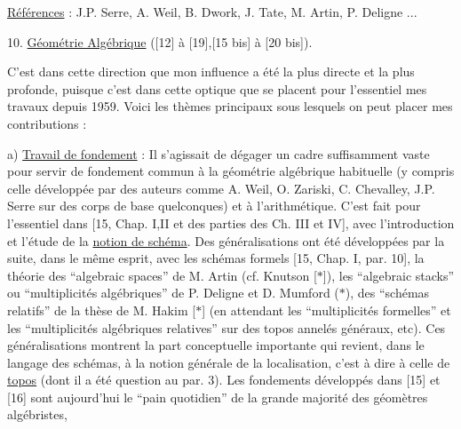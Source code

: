 
\uline{Références} : J.P. Serre, A. Weil, B. Dwork, J. Tate,
M. Artin, P. Deligne ...

10. \uline{Géométrie Algébrique} ([12] à [19],[15 bis] à [20 bis]).

C'est dans cette direction que mon influence
a été la plus directe et la plus profonde, puisque
c'est dans cette optique que se placent pour l'essentiel
mes travaux depuis 1959. Voici les thèmes principaux
sous lesquels on peut placer mes contributions :

a) \uline{Travail de fondement} : Il s'agissait de dégager
un cadre suffisamment vaste pour servir de fondement
commun à la géométrie algébrique habituelle (y compris
celle développée par des auteurs comme A. Weil,
O. Zariski, C. Chevalley, J.P. Serre sur des corps de
base quelconques) et à l'arithmétique. C'est fait pour
l'essentiel dans [15, Chap. I,II et des parties des
Ch. III et IV], avec l'introduction et l'étude de la
\uline{notion de schéma}. Des généralisations ont été développées
par la suite, dans le même esprit, avec les schémas
formels [15, Chap. I, par. 10], la théorie des
``algebraic spaces'' de M. Artin (cf. Knutson [$*$]), les
``algebraic stacks'' ou ``multiplicités algébriques'' de
P. Deligne et D. Mumford ($*$), des ``schémas relatifs''
de la thèse de M. Hakim [$*$] (en attendant les
``multiplicités formelles'' et les ``multiplicités algébriques
relatives'' sur des topos annelés généraux, etc). Ces
généralisations montrent la part conceptuelle importante
qui revient, dans le langage des schémas, à la notion
générale de la localisation, c'est à dire à celle de
\uline{topos} (dont il a été question au par. 3). Les fondements
développés dans [15] et [16] sont aujourd'hui le ``pain
quotidien'' de la grande majorité des géomètres algébristes,

